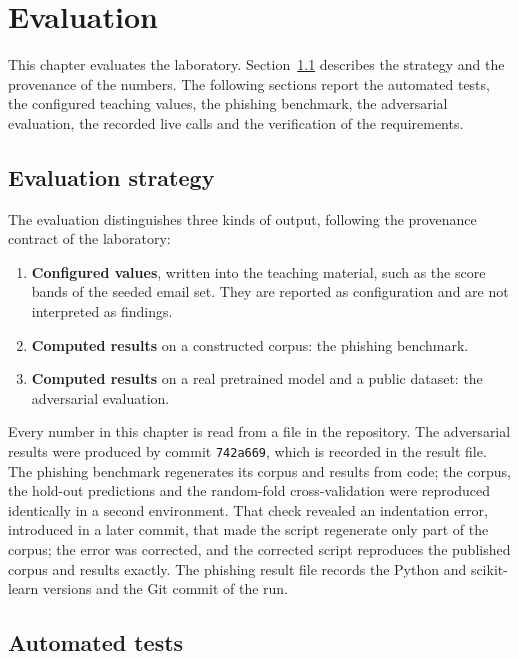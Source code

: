 \chapter{Evaluation}
\label{cha:eval}

This chapter evaluates the laboratory. Section~\ref{sec:eval-strategy} describes the strategy and the provenance of the numbers. The following sections report the automated tests, the configured teaching values, the phishing benchmark, the adversarial evaluation, the recorded live calls and the verification of the requirements.

\section{Evaluation strategy}
\label{sec:eval-strategy}

The evaluation distinguishes three kinds of output, following the provenance contract of the laboratory:

\begin{enumerate}
\item \textbf{Configured values}, written into the teaching material, such as the score bands of the seeded email set. They are reported as configuration and are not interpreted as findings.
\item \textbf{Computed results} on a constructed corpus: the phishing benchmark.
\item \textbf{Computed results} on a real pretrained model and a public dataset: the adversarial evaluation.
\end{enumerate}

Every number in this chapter is read from a file in the repository. The adversarial results were produced by commit \texttt{742a669}, which is recorded in the result file. The phishing benchmark regenerates its corpus and results from code; the corpus, the hold-out predictions and the random-fold cross-validation were reproduced identically in a second environment. That check revealed an indentation error, introduced in a later commit, that made the script regenerate only part of the corpus; the error was corrected, and the corrected script reproduces the published corpus and results exactly. The phishing result file records the Python and scikit-learn versions and the Git commit of the run.

\section{Automated tests}
\label{sec:eval-tests}

